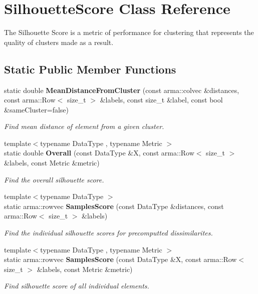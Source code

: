 \section{Silhouette\+Score Class Reference}
\label{classmlpack_1_1cv_1_1SilhouetteScore}


The Silhouette Score is a metric of performance for clustering that represents the quality of clusters made as a result.  


\subsection*{Static Public Member Functions}
\begin{DoxyCompactItemize}
\item 
static double \textbf{ Mean\+Distance\+From\+Cluster} (const arma\+::colvec \&distances, const arma\+::\+Row$<$ size\+\_\+t $>$ \&labels, const size\+\_\+t \&label, const bool \&same\+Cluster=false)
\begin{DoxyCompactList}\small\item\em Find mean distance of element from a given cluster. \end{DoxyCompactList}\item 
{\footnotesize template$<$typename Data\+Type , typename Metric $>$ }\\static double \textbf{ Overall} (const Data\+Type \&X, const arma\+::\+Row$<$ size\+\_\+t $>$ \&labels, const Metric \&metric)
\begin{DoxyCompactList}\small\item\em Find the overall silhouette score. \end{DoxyCompactList}\item 
{\footnotesize template$<$typename Data\+Type $>$ }\\static arma\+::rowvec \textbf{ Samples\+Score} (const Data\+Type \&distances, const arma\+::\+Row$<$ size\+\_\+t $>$ \&labels)
\begin{DoxyCompactList}\small\item\em Find the individual silhouette scores for precomputted dissimilarites. \end{DoxyCompactList}\item 
{\footnotesize template$<$typename Data\+Type , typename Metric $>$ }\\static arma\+::rowvec \textbf{ Samples\+Score} (const Data\+Type \&X, const arma\+::\+Row$<$ size\+\_\+t $>$ \&labels, const Metric \&metric)
\begin{DoxyCompactList}\small\item\em Find silhouette score of all individual elements. \end{DoxyCompactList}\end{DoxyCompactItemize}
